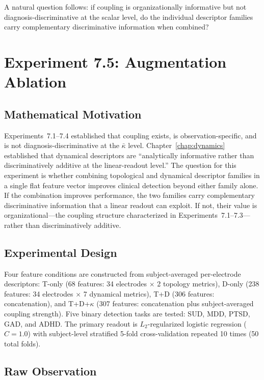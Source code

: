 A natural question follows: if coupling is organizationally informative but not diagnosis-discriminative at the scalar level, do the individual descriptor families carry complementary discriminative information when combined?


\section{Experiment 7.5: Augmentation Ablation}
\label{sec:exp7_augmentation}

\subsection{Mathematical Motivation}

Experiments~7.1--7.4 established that coupling exists, is observation-specific, and is not diagnosis-discriminative at the $\bar{\kappa}$ level. Chapter~\ref{chap:dynamics} established that dynamical descriptors are ``analytically informative rather than discriminatively additive at the linear-readout level.'' The question for this experiment is whether combining topological and dynamical descriptor families in a single flat feature vector improves clinical detection beyond either family alone. If the combination improves performance, the two families carry complementary discriminative information that a linear readout can exploit. If not, their value is organizational---the coupling structure characterized in Experiments~7.1--7.3---rather than discriminatively additive.

\subsection{Experimental Design}

Four feature conditions are constructed from subject-averaged per-electrode descriptors: T-only (68 features: 34 electrodes $\times$ 2 topology metrics), D-only (238 features: 34 electrodes $\times$ 7 dynamical metrics), T+D (306 features: concatenation), and T+D+$\kappa$ (307 features: concatenation plus subject-averaged coupling strength). Five binary detection tasks are tested: SUD, MDD, PTSD, GAD, and ADHD. The primary readout is $L_2$-regularized logistic regression ($C = 1.0$) with subject-level stratified 5-fold cross-validation repeated 10 times (50 total folds).

\subsection{Raw Observation}

